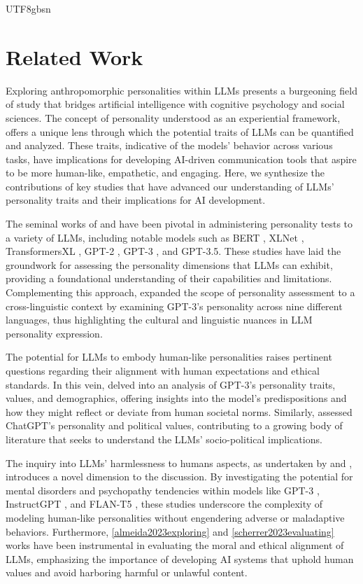 \documentclass{article}
\theoremstyle{plain}
\theoremstyle{definition}
\theoremstyle{remark}
\begin{document}
\begin{CJK*}{UTF8}{gbsn}
\iffalse
\section{Related Work} \label{sec-rw2}
Exploring anthropomorphic personalities within LLMs presents a burgeoning field of study that bridges artificial intelligence with cognitive psychology and social sciences. The concept of personality understood as an experiential framework, offers a unique lens through which the potential traits of LLMs can be quantified and analyzed. These traits, indicative of the models' behavior across various tasks, have implications for developing AI-driven communication tools that aspire to be more human-like, empathetic, and engaging. Here, we synthesize the contributions of key studies that have advanced our understanding of LLMs' personality traits and their implications for AI development.

The seminal works of \citet{jiang2023evaluating} and \citet{karra2023estimating} have been pivotal in administering personality tests to a variety of LLMs, including notable models such as BERT \citep{devlin-etal-2019-bert}, XLNet \citep{yang2019xlnet}, TransformersXL \citep{vaswani2017attention}, GPT-2 \citep{radford2019language}, GPT-3 \citep{brown2020language}, and GPT-3.5. These studies have laid the groundwork for assessing the personality dimensions that LLMs can exhibit, providing a foundational understanding of their capabilities and limitations. Complementing this approach, \citet{romero2023gpt} expanded the scope of personality assessment to a cross-linguistic context by examining GPT-3’s personality across nine different languages, thus highlighting the cultural and linguistic nuances in LLM personality expression.

The potential for LLMs to embody human-like personalities raises pertinent questions regarding their alignment with human expectations and ethical standards. In this vein, \citet{miotto-etal-2022-gpt} delved into an analysis of GPT-3’s personality traits, values, and demographics, offering insights into the model's predispositions and how they might reflect or deviate from human societal norms. Similarly, \citet{rutinowski2023selfperception} assessed ChatGPT's personality and political values, contributing to a growing body of literature that seeks to understand the LLMs' socio-political implications.

The inquiry into LLMs' harmlessness to humans aspects, as undertaken by \citet{li2023does} and \citet{codaforno2023inducing}, introduces a novel dimension to the discussion. By investigating the potential for mental disorders and psychopathy tendencies within models like GPT-3 \citep{brown2020language}, InstructGPT \citep{ouyang2022training}, and FLAN-T5 \citep{chung2022scaling}, these studies underscore the complexity of modeling human-like personalities without engendering adverse or maladaptive behaviors. Furthermore, \cref{almeida2023exploring} and \cref{scherrer2023evaluating} works have been instrumental in evaluating the moral and ethical alignment of LLMs, emphasizing the importance of developing AI systems that uphold human values and avoid harboring harmful or unlawful content.


\end{CJK*}
\end{document}
